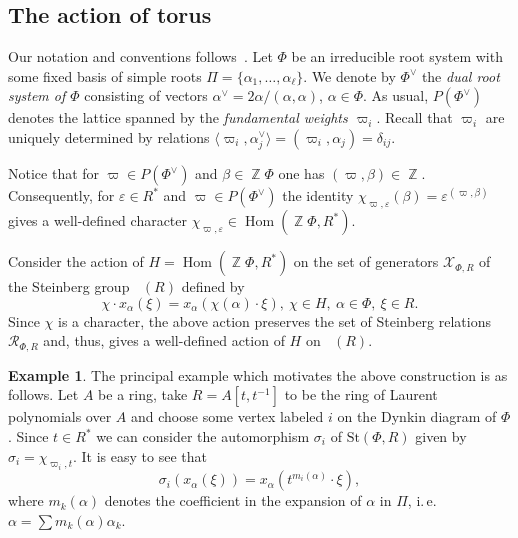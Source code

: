 \documentclass[oneside,12pt]{amsart}
\numberwithin{equation}{section}
\numberwithin{lem}{section}
\theoremstyle{definition}
\newtheorem{example}[lem]{Example}
\theoremstyle{remark}
\DeclareMathOperator{\St}{St^G}
\DeclareMathOperator{\Hom}{Hom}
\DeclareMathOperator{\ZZ}{{\mathbb Z}}
\newcommand{\Stb}{\mathrm{St}}
\begin{document}
\subsection{The action of torus}
Our notation and conventions follows~\cite[\S~4]{VavWE}.
Let $\Phi$ be an irreducible root system with some fixed basis of simple roots $\Pi = \{\alpha_1, \ldots, \alpha_\ell\}$.
We denote by $\Phi^\vee$ the \emph{dual root system of $\Phi$} consisting of vectors $\alpha^\vee = 2\alpha/(\alpha, \alpha)$, $\alpha\in \Phi$.
As usual, $P(\Phi^\vee)$ denotes the lattice spanned by the \emph{fundamental weights $\varpi_i$}.
Recall that $\varpi_i$ are uniquely determined by relations $\langle\varpi_i, \alpha_j^\vee \rangle = (\varpi_i, \alpha_j) = \delta_{ij}.$

Notice that for $\varpi \in P(\Phi^\vee)$ and $\beta \in \ZZ \Phi$ one has $(\varpi, \beta) \in \ZZ$.
Consequently, for $\varepsilon \in R^*$ and $\varpi \in P(\Phi^\vee)$ the identity $\chi_{\varpi, \varepsilon}(\beta) = \varepsilon ^ {(\varpi, \beta)}$
gives a well-defined character $\chi_{\varpi, \varepsilon} \in \Hom(\ZZ \Phi, R^*)$.

Consider the action of $H=\Hom(\ZZ \Phi, R^*)$ on the set of generators $\mathcal{X}_{\Phi, R}$ of the Steinberg group $\St(R)$ defined by
\begin{equation} \chi \cdot x_\alpha(\xi) = x_\alpha(\chi(\alpha) \cdot \xi),\ \chi \in H,\ \alpha\in \Phi,\ \xi \in R. \end{equation}
Since $\chi$ is a character, the above action preserves the set of Steinberg relations $\mathcal{R}_{\Phi, R}$ and,
thus, gives a well-defined action of $H$ on $\St(R)$.

\begin{example} The principal example which motivates the above construction is as follows.
Let $A$ be a ring, take $R = A[t, t^{-1}]$ to be the ring of Laurent polynomials over $A$ and choose some vertex labeled $i$ on the Dynkin diagram of $\Phi$.
Since $t \in R^*$ we can consider the automorphism $\sigma_i$ of $\Stb(\Phi, R)$ given by $\sigma_i = \chi_{\varpi_i, t}$.
It is easy to see that 
\begin{equation}\sigma_i(x_\alpha(\xi)) = x_\alpha(t^{m_i(\alpha)} \cdot \xi),\end{equation}
where $m_k(\alpha)$ denotes the coefficient in the expansion of $\alpha$ in $\Pi$, i.\,e. $\alpha = \sum m_k(\alpha) \alpha_k$.
\end{example}


\end{document}
